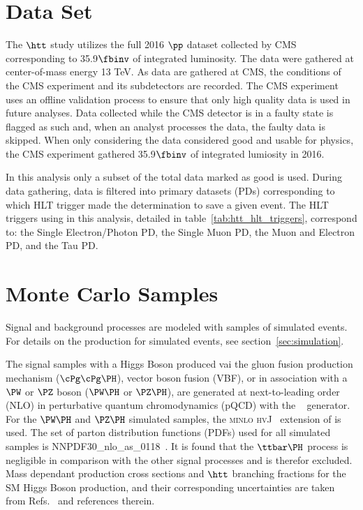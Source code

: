 \section{Data Set}
The $\htt$ study utilizes the full 2016 $\pp$ dataset collected by CMS corresponding to 35.9$\fbinv$ 
of integrated luminosity.  The data were gathered at center-of-mass energy 13 TeV.
As data are gathered at CMS, the conditions of the CMS experiment and its subdetectors are recorded.
The CMS experiment uses an offline validation process to ensure that only high quality
data is used in future analyses.  Data collected while the CMS detector is in a faulty state
is flagged as such and, when an analyst processes the data, the faulty data is skipped.
When only considering the data considered good and usable for physics, the CMS experiment
gathered 35.9$\fbinv$ of integrated lumiosity in 2016.

In this analysis only a subset of the total data marked as good is used.  During data
gathering, data is filtered into primary datasets (PDs) corresponding to which HLT trigger
made the determination to save a given event.  The HLT triggers using in this analysis,
detailed in table~\ref{tab:htt_hlt_triggers}, correspond to: the Single Electron/Photon
PD, the Single Muon PD, the Muon and Electron PD, and the Tau PD.



\section{Monte Carlo Samples}
Signal and background processes are modeled with samples of simulated events.
For details on the production for simulated events, see section~\ref{sec:simulation}.

The signal samples with a Higgs Boson produced vai the gluon fusion production
mechanism ($\cPg\cPg\PH$), vector boson fusion (VBF), or in association with a $\PW$ or $\PZ$ boson ($\PW\PH$ or $\PZ\PH$), 
are generated at next-to-leading order (NLO) in perturbative quantum chromodynamics (pQCD) 
with the ~\cite{Nason:2004rx,Frixione:2007vw, Alioli:2010xd, Alioli:2010xa, Alioli:2008tz} 
generator. For the $\PW\PH$ and $\PZ\PH$ simulated samples, the \textsc{minlo hvJ}~\cite{Luisoni:2013kna} 
extension of  is used. The set of parton distribution functions (PDFs) used for all
simulated samples is NNPDF30\_nlo\_as\_0118~\cite{Ball:2011uy}. It is found that the $\ttbar\PH$ 
process is negligible in comparison with the other signal processes and is therefor excluded.
Mass dependant production cross sections and $\htt$ branching fractions for the SM Higgs Boson production, 
and their corresponding uncertainties are taken from 
Refs.~\cite{deFlorian:2016spz,Denner:2011mq,Ball:2011mu} and references therein.


